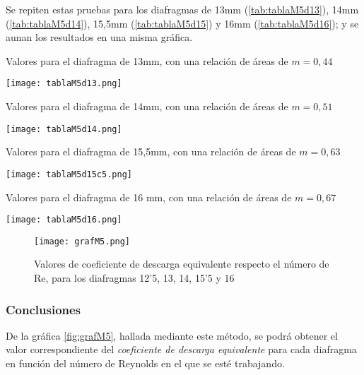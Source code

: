 Se repiten estas pruebas para los diafragmas de 13mm (\autoref{tab:tablaM5d13}), 14mm (\autoref{tab:tablaM5d14}), 15,5mm (\autoref{tab:tablaM5d15}) y 16mm (\autoref{tab:tablaM5d16}); y se aunan los resultados en una misma gráfica.

\begin{table}[hb]
\centering
\caption[Valores para el diafragma de $13mm$]{Valores para el diafragma de 13mm, con una relación de áreas de $m=0,44$}
\texttt{[image: tablaM5d13.png]}
\label{tab:tablaM5d13}
\end{table}

\begin{table}
\centering
\caption[Valores para el diafragma de $14mm$]{Valores para el diafragma de 14mm, con una relación de áreas de $m=0,51$}
\texttt{[image: tablaM5d14.png]}
\label{tab:tablaM5d14}
\end{table}

\begin{table}
\centering
\caption[Valores para el diafragma de $15,5mm$]{Valores para el diafragma de 15,5mm, con una relación de áreas de $m=0,63$}
\texttt{[image: tablaM5d15c5.png]}
\label{tab:tablaM5d15}
\end{table}

\begin{table}
\centering
\caption[Valores para el diafragma de $16mm$]{Valores para el diafragma de 16 mm, con una relación de áreas de $m=0,67$}
\texttt{[image: tablaM5d16.png]}
\label{tab:tablaM5d16}
\end{table}

\begin{figure}
\centering
\texttt{[image: grafM5.png]}
\caption[Valores de coeficiente de descarga equivalente]{Valores de coeficiente de descarga equivalente respecto el número de Re, para los diafragmas 12'5, 13, 14, 15'5 y 16}
\label{fig:grafM5}
\end{figure}

\subsubsection{Conclusiones}\label{header-n498}

De la gráfica \autoref{fig:grafM5}, hallada mediante este método, se podrá obtener el
valor correspondiente del \emph{coeficiente de descarga equivalente}
para cada diafragma en función del número de Reynolds en el que se esté
trabajando.

